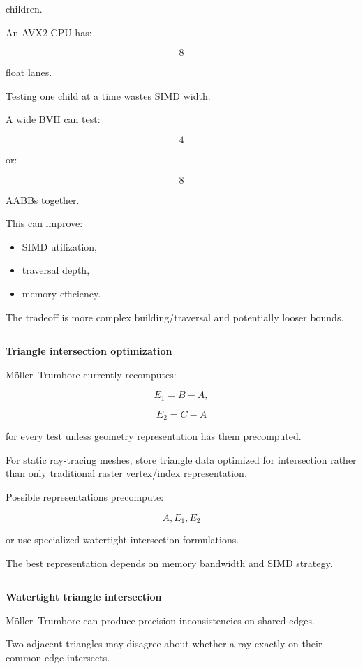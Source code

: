 children.

An AVX2 CPU has:

\[
8
\]

float lanes.

Testing one child at a time wastes SIMD width.

A wide BVH can test:

\[
4
\]

or:

\[
8
\]

AABBs together.

This can improve:

\begin{itemize}
\tightlist
\item
  SIMD utilization,
\item
  traversal depth,
\item
  memory efficiency.
\end{itemize}

The tradeoff is more complex building/traversal and potentially looser bounds.

\begin{center}\rule{0.5\linewidth}{0.5pt}\end{center}

\textbf{Triangle intersection optimization}

Möller--Trumbore currently recomputes:

\[
E_1=B-A,
\]

\[
E_2=C-A
\]

for every test unless geometry representation has them precomputed.

For static ray-tracing meshes, store triangle data optimized for intersection rather than only traditional raster vertex/index representation.

Possible representations precompute:

\[
A,
E_1,E_2
\]

or use specialized watertight intersection formulations.

The best representation depends on memory bandwidth and SIMD strategy.

\begin{center}\rule{0.5\linewidth}{0.5pt}\end{center}

\textbf{Watertight triangle intersection}

Möller--Trumbore can produce precision inconsistencies on shared edges.

Two adjacent triangles may disagree about whether a ray exactly on their common edge intersects.


